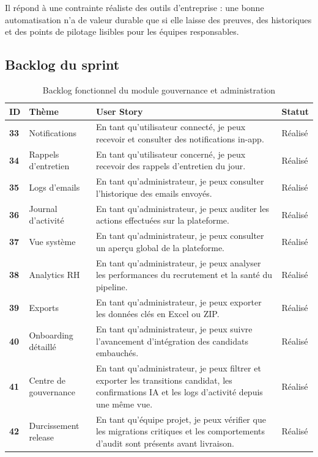 Il répond à une contrainte réaliste des outils d'entreprise : une bonne automatisation n'a de valeur durable que si elle laisse des preuves, des historiques et des points de pilotage lisibles pour les équipes responsables.

\subsection{Backlog du sprint}
\begin{table}[H]
  \centering
  \caption{Backlog fonctionnel du module gouvernance et administration}
  \begin{tabularx}{\textwidth}{>{\bfseries}p{1.3cm}p{3cm}X>{\raggedright\arraybackslash}p{2cm}}
    \toprule
    ID & Thème & User Story & Statut \\
    \midrule
    33 & Notifications & En tant qu'utilisateur connecté, je peux recevoir et consulter des notifications in-app. & Réalisé \\
    34 & Rappels d'entretien & En tant qu'utilisateur concerné, je peux recevoir des rappels d'entretien du jour. & Réalisé \\
    35 & Logs d'emails & En tant qu'administrateur, je peux consulter l'historique des emails envoyés. & Réalisé \\
    36 & Journal d'activité & En tant qu'administrateur, je peux auditer les actions effectuées sur la plateforme. & Réalisé \\
    37 & Vue système & En tant qu'administrateur, je peux consulter un aperçu global de la plateforme. & Réalisé \\
    38 & Analytics RH & En tant qu'administrateur, je peux analyser les performances du recrutement et la santé du pipeline. & Réalisé \\
    39 & Exports & En tant qu'administrateur, je peux exporter les données clés en Excel ou ZIP. & Réalisé \\
    40 & Onboarding détaillé & En tant qu'administrateur, je peux suivre l'avancement d'intégration des candidats embauchés. & Réalisé \\
    41 & Centre de gouvernance & En tant qu'administrateur, je peux filtrer et exporter les transitions candidat, les confirmations IA et les logs d'activité depuis une même vue. & Réalisé \\
    42 & Durcissement release & En tant qu'équipe projet, je peux vérifier que les migrations critiques et les comportements d'audit sont présents avant livraison. & Réalisé \\

\end{tabularx}
\end{table}
